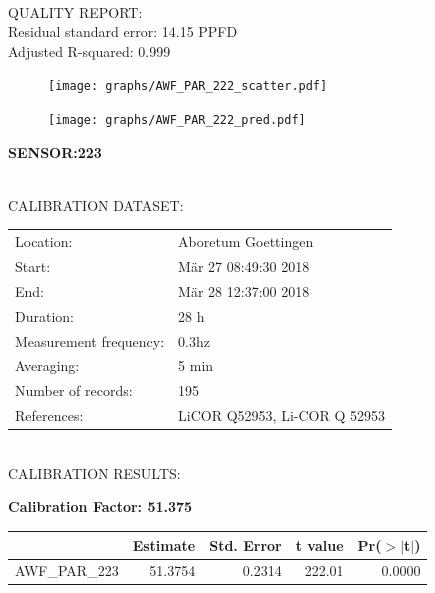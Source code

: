 \documentclass[oneside]{report}
\begin{document}
\hrulefill\\
QUALITY REPORT:\\
Residual standard error: 14.15 PPFD\\
Adjusted R-squared: 0.999



\begin{figure}[H]
  \centering
  \texttt{[image: graphs/AWF\_PAR\_222\_scatter.pdf]}
\end{figure}




\begin{figure}[H]
  \centering
  \texttt{[image: graphs/AWF\_PAR\_222\_pred.pdf]}
\end{figure}

\pagebreak


\begin{center}
\large{\textbf{SENSOR:223}}\\
\end{center}

\hrulefill\\
CALIBRATION DATASET:\\
\begin{table}[h!]
  \centering
  \label{tab:table1}
  \begin{tabular}{ll}
    Location: & Aboretum Goettingen\\ 
    
    
    Start:  & Mär 27 08:49:30 2018 \\
    End:   & Mär 28 12:37:00 2018\\ 
    Duration: & 28 h\\
    Measurement frequency: & 0.3hz\\
    Averaging:  &5 min\\
    Number of records: & 195 \\
    References: & LiCOR Q52953, Li-COR Q 52953 \\
  \end{tabular}
\end{table}

\hrulefill\\
CALIBRATION RESULTS:\\


\begin{center}
\textbf{\large{Calibration Factor: 51.375}}\\
\end{center}
\begin{table}[ht]
\centering
\begin{tabular}{rrrrr}
  \hline
 & Estimate & Std. Error & t value & Pr($>$$|$t$|$) \\ 
  \hline
AWF\_PAR\_223 & 51.3754 & 0.2314 & 222.01 & 0.0000 \\ 
   \hline
\end{tabular}
\end{table}
\end{document}
